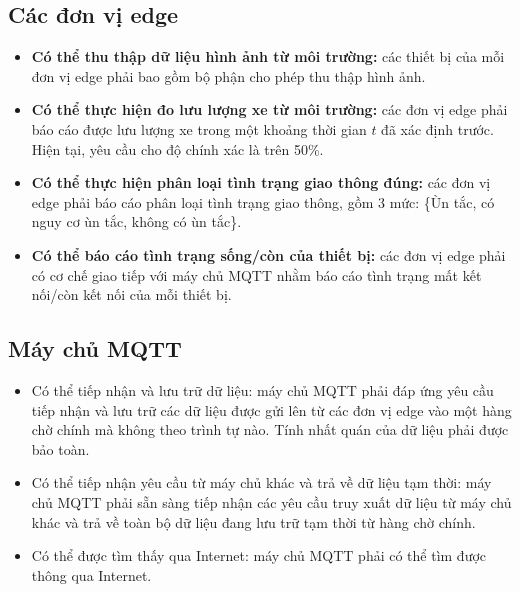 \subsection{Các đơn vị edge}
\begin{itemize}
    \item \textbf{Có thể thu thập dữ liệu hình ảnh từ môi trường:} các thiết bị của mỗi đơn vị edge phải bao gồm bộ phận cho phép thu thập hình ảnh.
    \item \textbf{Có thể thực hiện đo lưu lượng xe từ môi trường:} các đơn vị edge phải báo cáo được lưu lượng xe trong một khoảng thời gian $t$ đã xác định trước. Hiện tại, yêu cầu cho độ chính xác là trên 50\%.
    \item \textbf{Có thể thực hiện phân loại tình trạng giao thông đúng:} các đơn vị edge phải báo cáo phân loại tình trạng giao thông, gồm 3 mức: \{Ùn tắc, có nguy cơ ùn tắc, không có ùn tắc\}.
    \item \textbf{Có thể báo cáo tình trạng sống/còn của thiết bị:} các đơn vị edge phải có cơ chế giao tiếp với máy chủ MQTT nhằm báo cáo tình trạng mất kết nối/còn kết nối của mỗi thiết bị.
\end{itemize}

\subsection{Máy chủ MQTT}
\begin{itemize}
    \item Có thể tiếp nhận và lưu trữ dữ liệu: máy chủ MQTT phải đáp ứng yêu cầu tiếp nhận và lưu trữ các dữ liệu được gửi lên từ các đơn vị edge vào một hàng chờ chính mà không theo trình tự nào. Tính nhất quán của dữ liệu phải được bảo toàn.
    \item Có thể tiếp nhận yêu cầu từ máy chủ khác và trả về dữ liệu tạm thời: máy chủ MQTT phải sẵn sàng tiếp nhận các yêu cầu truy xuất dữ liệu từ máy chủ khác và trả về toàn bộ dữ liệu đang lưu trữ tạm thời từ hàng chờ chính.
    \item Có thể được tìm thấy qua Internet: máy chủ MQTT phải có thể tìm được thông qua Internet.
\end{itemize}

